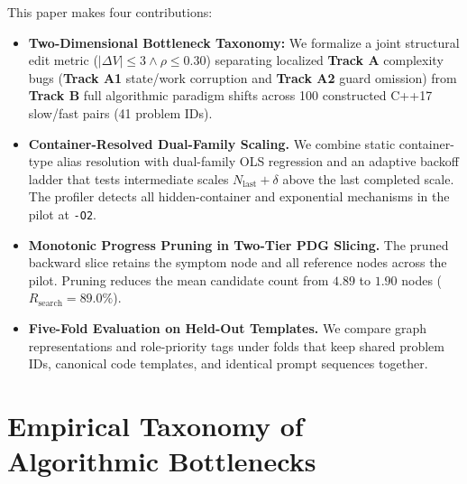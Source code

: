 This paper makes four contributions:
\begin{itemize}
    \item \textbf{Two-Dimensional Bottleneck Taxonomy:} We formalize a joint structural edit metric ($|\Delta V| \le 3 \land \rho \le 0.30$) separating localized \textbf{Track A} complexity bugs (\textbf{Track A1} state/work corruption and \textbf{Track A2} guard omission) from \textbf{Track B} full algorithmic paradigm shifts across 100 constructed C++17 slow/fast pairs (41 problem IDs).
    \item \textbf{Container-Resolved Dual-Family Scaling.} We combine static container-type alias resolution with dual-family OLS regression and an adaptive backoff ladder that tests intermediate scales $N_{\text{last}}+\delta$ above the last completed scale. The profiler detects all hidden-container and exponential mechanisms in the pilot at \texttt{-O2}.
    \item \textbf{Monotonic Progress Pruning in Two-Tier PDG Slicing.} The pruned backward slice retains the symptom node and all reference nodes across the pilot. Pruning reduces the mean candidate count from $4.89$ to $1.90$ nodes ($R_{\text{search}} = 89.0\%$).
    \item \textbf{Five-Fold Evaluation on Held-Out Templates.} We compare graph representations and role-priority tags under folds that keep shared problem IDs, canonical code templates, and identical prompt sequences together.
\end{itemize}

\section{Empirical Taxonomy of Algorithmic Bottlenecks}
\label{sec:taxonomy}

